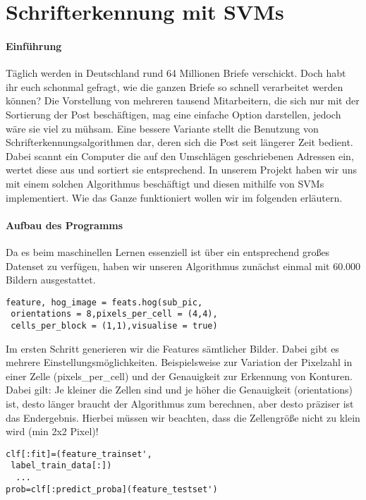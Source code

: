 \section{Schrifterkennung mit SVMs}

\paragraph{Einführung}
Täglich werden in Deutschland rund 64 Millionen Briefe verschickt. Doch habt ihr euch schonmal gefragt, wie die ganzen Briefe so schnell verarbeitet werden können? Die Vorstellung von mehreren tausend Mitarbeitern, die sich nur mit der Sortierung der Post beschäftigen, mag eine einfache Option darstellen, jedoch wäre sie viel zu mühsam. Eine bessere Variante stellt die Benutzung von Schrifterkennungsalgorithmen dar, deren sich die Post seit längerer Zeit bedient. Dabei scannt ein Computer die auf den Umschlägen geschriebenen Adressen ein, wertet diese aus und sortiert sie entsprechend. In unserem Projekt haben wir uns mit einem solchen Algorithmus beschäftigt und diesen mithilfe von SVMs implementiert. Wie das Ganze funktioniert wollen wir im folgenden erläutern.

\paragraph{Aufbau des Programms}

Da es beim maschinellen Lernen essenziell ist über ein entsprechend großes Datenset zu verfügen, haben wir unseren Algorithmus zunächst einmal mit 60.000 Bildern ausgestattet. 

\begin{verbatim}
feature, hog_image = feats.hog(sub_pic,
 orientations = 8,pixels_per_cell = (4,4),
 cells_per_block = (1,1),visualise = true)
\end{verbatim}

Im ersten Schritt generieren wir die Features sämtlicher Bilder. Dabei gibt es mehrere Einstellungsmöglichkeiten. Beispielsweise zur Variation der Pixelzahl in einer Zelle (pixels\_per\_cell) und der Genauigkeit zur Erkennung von Konturen. Dabei gilt: Je kleiner die Zellen sind und je höher die Genauigkeit (orientations) ist, desto länger braucht der Algorithmus zum berechnen, aber desto präziser ist das Endergebnis. Hierbei müssen wir beachten, dass die Zellengröße nicht zu klein wird (min 2x2 Pixel)!

\begin{verbatim}
clf[:fit]=(feature_trainset', 
 label_train_data[:])
  ...
prob=clf[:predict_proba](feature_testset')
\end{verbatim}

